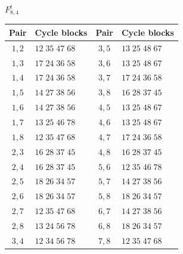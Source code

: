 \documentclass[11pt,a4paper]{article}
\theoremstyle{plain}
\theoremstyle{definition}
\numberwithin{equation}{section}
\begin{document}
\begin{center}\small
$F_{8,4}^{t}$\par\nopagebreak[4]\smallskip\nopagebreak[4]
\begin{tabular}{cl@{\qquad}cl}\toprule Pair&Cycle blocks&Pair&Cycle blocks\\\midrule
$1,2$ & $12\;35\;47\;68$ & $3,5$ & $13\;25\;48\;67$ \\
$1,3$ & $17\;24\;36\;58$ & $3,6$ & $13\;25\;48\;67$ \\
$1,4$ & $17\;24\;36\;58$ & $3,7$ & $17\;24\;36\;58$ \\
$1,5$ & $14\;27\;38\;56$ & $3,8$ & $16\;28\;37\;45$ \\
$1,6$ & $14\;27\;38\;56$ & $4,5$ & $13\;25\;48\;67$ \\
$1,7$ & $13\;25\;46\;78$ & $4,6$ & $13\;25\;48\;67$ \\
$1,8$ & $12\;35\;47\;68$ & $4,7$ & $17\;24\;36\;58$ \\
$2,3$ & $16\;28\;37\;45$ & $4,8$ & $16\;28\;37\;45$ \\
$2,4$ & $16\;28\;37\;45$ & $5,6$ & $12\;35\;46\;78$ \\
$2,5$ & $18\;26\;34\;57$ & $5,7$ & $14\;27\;38\;56$ \\
$2,6$ & $18\;26\;34\;57$ & $5,8$ & $18\;26\;34\;57$ \\
$2,7$ & $12\;35\;47\;68$ & $6,7$ & $14\;27\;38\;56$ \\
$2,8$ & $13\;24\;56\;78$ & $6,8$ & $18\;26\;34\;57$ \\
$3,4$ & $12\;34\;56\;78$ & $7,8$ & $12\;35\;47\;68$ \\
\bottomrule\end{tabular}
\end{center}
\end{document}
